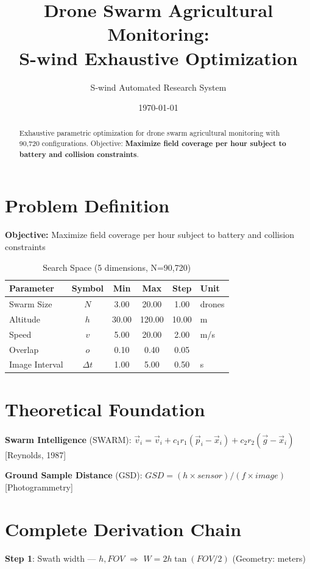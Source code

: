 \documentclass[11pt,twocolumn]{article}
\title{Drone Swarm Agricultural Monitoring: \\S-wind Exhaustive Optimization}
\author{S-wind Automated Research System}
\date{\today}
\begin{document}
\maketitle

\begin{abstract}
Exhaustive parametric optimization for drone swarm agricultural monitoring with 90,720 configurations.
Objective: \textbf{Maximize field coverage per hour subject to battery and collision constraints}.
\end{abstract}

\section{Problem Definition}
\textbf{Objective:} Maximize field coverage per hour subject to battery and collision constraints

\begin{table}[h]
\centering
\caption{Search Space (5 dimensions, N=90,720)}
\begin{tabular}{@{}lccccl@{}}
\toprule
Parameter & Symbol & Min & Max & Step & Unit \\
\midrule
Swarm Size & $N$ & 3.00 & 20.00 & 1.00 & drones \\
Altitude & $h$ & 30.00 & 120.00 & 10.00 & m \\
Speed & $v$ & 5.00 & 20.00 & 2.00 & m/s \\
Overlap & $o$ & 0.10 & 0.40 & 0.05 &  \\
Image Interval & $\Delta t$ & 1.00 & 5.00 & 0.50 & s \\
\bottomrule
\end{tabular}
\end{table}

\section{Theoretical Foundation}
\textbf{Swarm Intelligence} (SWARM): $\vec{v}_i = \vec{v}_i + c_1 r_1(\vec{p}_i-\vec{x}_i) + c_2 r_2(\vec{g}-\vec{x}_i)$ [Reynolds, 1987]

\textbf{Ground Sample Distance} (GSD): $GSD = (h \times sensor)/(f \times image)$ [Photogrammetry]


\section{Complete Derivation Chain}
\textbf{Step 1}: Swath width --- $h, FOV$ $\Rightarrow$ $W = 2h \tan(FOV/2)$ (Geometry: meters)
\end{document}
